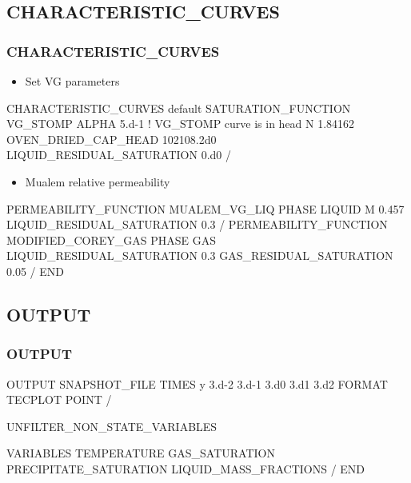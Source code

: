 \documentclass{beamer}
\newcommand\bluecomment[1]{{{\color{blue} #1}}}
\begin{document}
\subsection{CHARACTERISTIC\_CURVES}

\begin{frame}\frametitle{CHARACTERISTIC\_CURVES}

\begin{itemize}
\item Set VG parameters
\end{itemize}

\begin{semiverbatim}
CHARACTERISTIC_CURVES default
  SATURATION_FUNCTION VG_STOMP
    ALPHA 5.d-1 \bluecomment{! VG_STOMP curve is in head}
    N 1.84162
    OVEN_DRIED_CAP_HEAD 102108.2d0
    LIQUID_RESIDUAL_SATURATION 0.d0
  /
\end{semiverbatim}

\newpage
\begin{itemize}
\item Mualem relative permeability
\end{itemize}

\begin{semiverbatim}
  PERMEABILITY_FUNCTION MUALEM_VG_LIQ
    PHASE LIQUID
    M 0.457
    LIQUID_RESIDUAL_SATURATION 0.3
  /
  PERMEABILITY_FUNCTION MODIFIED_COREY_GAS
    PHASE GAS
    LIQUID_RESIDUAL_SATURATION 0.3
    GAS_RESIDUAL_SATURATION 0.05
  /
END
\end{semiverbatim}

\end{frame}

\subsection{OUTPUT}

\begin{frame}[fragile]\frametitle{OUTPUT}

\begin{semiverbatim}
OUTPUT
  SNAPSHOT_FILE
    TIMES y 3.d-2 3.d-1 3.d0 3.d1 3.d2
    FORMAT TECPLOT POINT
  /

  UNFILTER_NON_STATE_VARIABLES

  VARIABLES
   TEMPERATURE
   GAS_SATURATION
   PRECIPITATE_SATURATION
   LIQUID_MASS_FRACTIONS
  /
END
\end{semiverbatim}

\end{frame}
\end{document}
